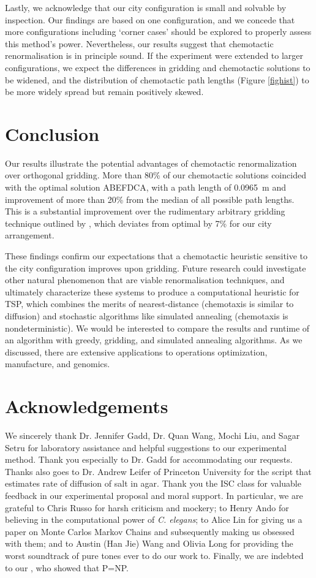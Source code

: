 \documentclass[10pt]{article}
\begin{document}
Lastly, we acknowledge that our city configuration is small and solvable by inspection. Our findings are based on one configuration, and we concede that more configurations including `corner cases' should be explored to properly assess this method's power. Nevertheless, our results suggest that chemotactic renormalisation is in principle sound. If the experiment were extended to larger configurations, we expect the differences in gridding and chemotactic solutions to be widened, and the distribution of chemotactic path lengths (Figure \ref{fighist}) to be more widely spread but remain positively skewed.


\section{Conclusion}

Our results illustrate the potential advantages of chemotactic renormalization over orthogonal gridding. More than 80\% of our chemotactic solutions coincided with the optimal solution ABEFDCA, with a path length of \SI{0.0965}{\metre} and improvement of more than 20\% from the median of all possible path lengths. This is a substantial improvement over the rudimentary arbitrary gridding technique outlined by \citet{Yoshiyuki1995}, which deviates from optimal by 7\% for our city arrangement. 

These findings confirm our expectations that a chemotactic heuristic sensitive to the city configuration improves upon gridding. Future research could investigate other natural phenomenon that are viable renormalisation techniques, and ultimately characterize these systems to produce a computational heuristic for TSP, which combines the merits of nearest-distance (chemotaxis is similar to diffusion) and stochastic algorithms like simulated annealing (chemotaxis is nondeterministic). We would be interested to compare the results and runtime of an algorithm with greedy, gridding, and simulated annealing algorithms. As we discussed, there are extensive applications to operations optimization, manufacture, and genomics.


\section{Acknowledgements}

We sincerely thank Dr. Jennifer Gadd, Dr. Quan Wang, Mochi Liu, and Sagar Setru for laboratory assistance and helpful suggestions to our experimental method. Thank you especially to Dr. Gadd for accommodating our requests. Thanks also goes to Dr. Andrew Leifer of Princeton University for the script that estimates rate of diffusion of salt in agar. Thank you the ISC class for valuable feedback in our experimental proposal and moral support. In particular, we are grateful to Chris Russo for harsh criticism and mockery; to Henry Ando for believing in the computational power of \textit{C. elegans}; to Alice Lin for giving us a paper on Monte Carlos Markov Chains and subsequently making us obsessed with them; and to Austin (Han Jie) Wang and Olivia Long for providing the worst soundtrack of pure tones ever to do our work to. Finally, we are indebted to our , who showed that P=NP.
\end{document}
